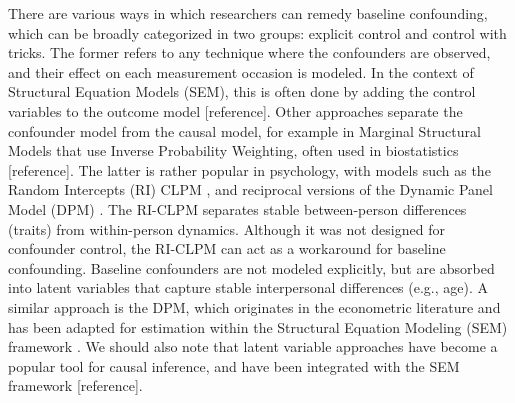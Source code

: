 \documentclass{article}
\begin{document}
	\noindent
	There are various ways in which researchers can remedy baseline confounding, which can be broadly categorized in two groups: explicit control and control with tricks. The former refers to any technique where the confounders are observed, and their effect on each measurement occasion is modeled. In the context of Structural Equation Models (SEM), this is often done by adding the control variables to the outcome model [reference]. Other approaches separate the confounder model from the causal model, for example in Marginal Structural Models that use Inverse Probability Weighting, often used in biostatistics [reference]. The latter is rather popular in psychology, with models such as the Random Intercepts (RI) CLPM  \citep{hamaker2015critique}, and reciprocal versions of the Dynamic Panel Model (DPM) \citep{dishop2022tutorial}. The RI-CLPM separates stable between-person differences (traits) from within-person dynamics. Although it was not designed for confounder control, the RI-CLPM can act as a workaround for baseline confounding. Baseline confounders are not modeled explicitly, but are absorbed into latent variables that capture stable interpersonal differences (e.g., age). A similar approach is the DPM, which originates in the econometric literature and has been adapted for estimation within the Structural Equation Modeling (SEM) framework \citep{allison2017maximum}. We should also note that latent variable approaches have become a popular tool for causal inference, and have been integrated with the SEM framework [reference]. 
	
	\noindent
	
	
	
	\FloatBarrier
	
	
	
	
\end{document}
